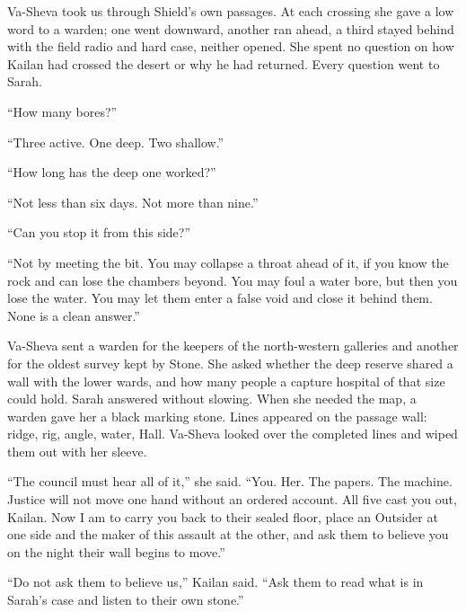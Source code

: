 Va-Sheva took us through Shield's own passages. At each crossing she gave a low word to a warden; one went downward, another ran ahead, a third stayed behind with the field radio and hard case, neither opened. She spent no question on how Kailan had crossed the desert or why he had returned. Every question went to Sarah.\par

``How many bores?''\par

``Three active. One deep. Two shallow.''\par

``How long has the deep one worked?''\par

``Not less than six days. Not more than nine.''\par

``Can you stop it from this side?''\par

``Not by meeting the bit. You may collapse a throat ahead of it, if you know the rock and can lose the chambers beyond. You may foul a water bore, but then you lose the water. You may let them enter a false void and close it behind them. None is a clean answer.''\par

Va-Sheva sent a warden for the keepers of the north-western galleries and another for the oldest survey kept by Stone. She asked whether the deep reserve shared a wall with the lower wards, and how many people a capture hospital of that size could hold. Sarah answered without slowing. When she needed the map, a warden gave her a black marking stone. Lines appeared on the passage wall: ridge, rig, angle, water, Hall. Va-Sheva looked over the completed lines and wiped them out with her sleeve.\par

``The council must hear all of it,'' she said. ``You. Her. The papers. The machine. Justice will not move one hand without an ordered account. All five cast you out, Kailan. Now I am to carry you back to their sealed floor, place an Outsider at one side and the maker of this assault at the other, and ask them to believe you on the night their wall begins to move.''\par

``Do not ask them to believe us,'' Kailan said. ``Ask them to read what is in Sarah's case and listen to their own stone.''\par

